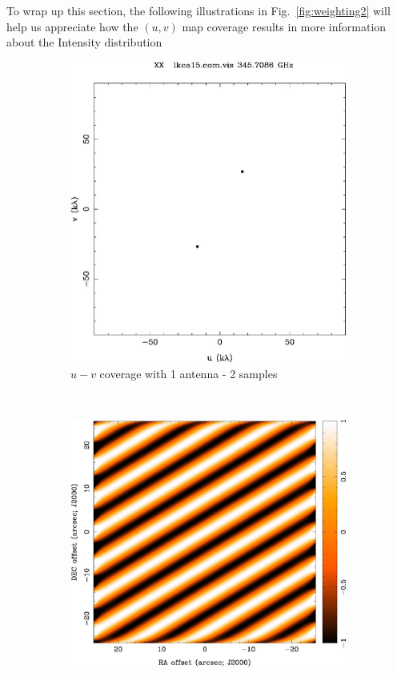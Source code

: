 To wrap up this section, the following illustrations in Fig.~\ref{fig:weighting2} will help us appreciate how the $(u,v)$ map coverage results in more information about the Intensity distribution  
\begin{figure}
        \centering
        \begin{subfigure}[b]{0.5\textwidth}
                \includegraphics[scale=0.4]{Figures/uv-coverage/1antcov}
                \caption{$u-v$ coverage with 1 antenna - 2 samples}
                \label{fig:uv1ant}
        \end{subfigure}%
        ~ %
        \begin{subfigure}[b]{0.5\textwidth}
                \includegraphics[scale=0.4]{Figures/uv-coverage/1antIma}

\end{subfigure}
\end{figure}
